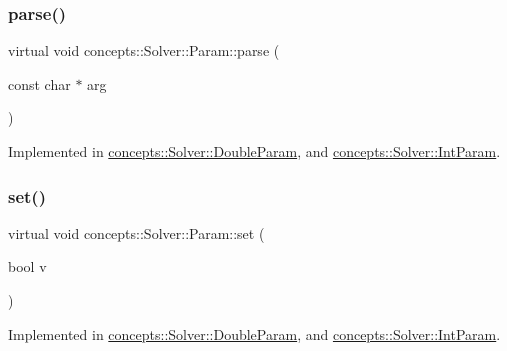 \subsubsection{\texorpdfstring{parse()}{parse()}}
{\footnotesize\ttfamily virtual void concepts\+::\+Solver\+::\+Param\+::parse (\begin{DoxyParamCaption}\item[{const char $\ast$}]{arg }\end{DoxyParamCaption})\hspace{0.3cm}{\ttfamily [pure virtual]}}



Implemented in \hyperlink{classconcepts_1_1_solver_1_1_double_param_a9d9cf1f190f8e7b7c4840f0d44fefa1b}{concepts\+::\+Solver\+::\+Double\+Param}, and \hyperlink{classconcepts_1_1_solver_1_1_int_param_a81c8c88fe73047c6c1b8d5a87d70be24}{concepts\+::\+Solver\+::\+Int\+Param}.

\mbox{\label{classconcepts_1_1_solver_1_1_param_aa525a1a88dd771eaf5d66f35323fbb86}} 
\subsubsection{\texorpdfstring{set()}{set()}\hspace{0.1cm}{\footnotesize\ttfamily [1/3]}}
{\footnotesize\ttfamily virtual void concepts\+::\+Solver\+::\+Param\+::set (\begin{DoxyParamCaption}\item[{bool}]{v }\end{DoxyParamCaption})\hspace{0.3cm}{\ttfamily [pure virtual]}}



Implemented in \hyperlink{classconcepts_1_1_solver_1_1_double_param_a006e726301f821c96edb00b4ca2ea345}{concepts\+::\+Solver\+::\+Double\+Param}, and \hyperlink{classconcepts_1_1_solver_1_1_int_param_aad1fef920b810b30289a2863d4ab6a52}{concepts\+::\+Solver\+::\+Int\+Param}.

\mbox{\label{classconcepts_1_1_solver_1_1_param_ad3de8144a70e67eeae4278f534e46274}} 
